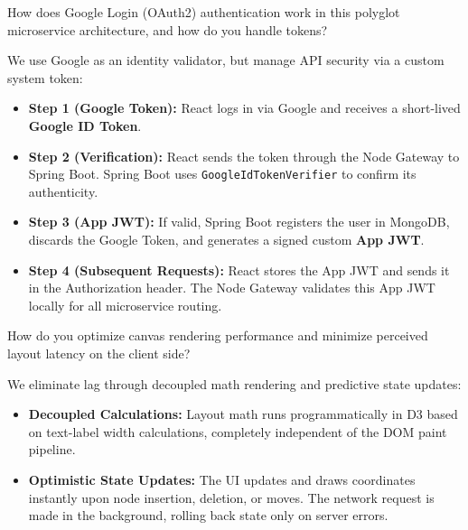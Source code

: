 \documentclass[12pt, a4paper]{article}
\begin{document}
\begin{questionbox}
How does Google Login (OAuth2) authentication work in this polyglot microservice architecture, and how do you handle tokens?
\end{questionbox}

\begin{answerbox}[Answer]
We use Google as an identity validator, but manage API security via a custom system token:
\begin{itemize}
  \item \textbf{Step 1 (Google Token):} React logs in via Google and receives a short-lived \textbf{Google ID Token}.
  \item \textbf{Step 2 (Verification):} React sends the token through the Node Gateway to Spring Boot. Spring Boot uses \texttt{GoogleIdTokenVerifier} to confirm its authenticity.
  \item \textbf{Step 3 (App JWT):} If valid, Spring Boot registers the user in MongoDB, discards the Google Token, and generates a signed custom \textbf{App JWT}.
  \item \textbf{Step 4 (Subsequent Requests):} React stores the App JWT and sends it in the Authorization header. The Node Gateway validates this App JWT locally for all microservice routing.
\end{itemize}
\end{answerbox}

\begin{questionbox}
How do you optimize canvas rendering performance and minimize perceived layout latency on the client side?
\end{questionbox}

\begin{answerbox}[Answer]
We eliminate lag through decoupled math rendering and predictive state updates:
\begin{itemize}
  \item \textbf{Decoupled Calculations:} Layout math runs programmatically in D3 based on text-label width calculations, completely independent of the DOM paint pipeline.
  \item \textbf{Optimistic State Updates:} The UI updates and draws coordinates instantly upon node insertion, deletion, or moves. The network request is made in the background, rolling back state only on server errors.
\end{itemize}
\end{answerbox}
\end{document}
